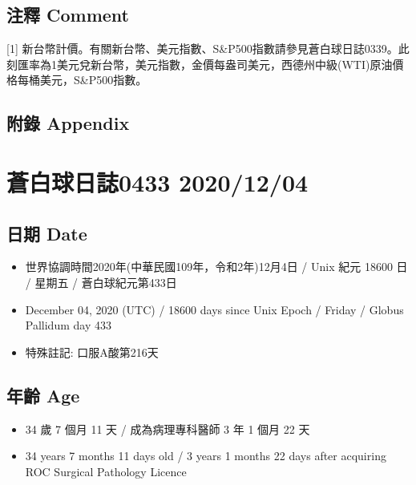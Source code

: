 \documentclass[a5paper, 10pt
]{book}
\providecommand{\tightlist}{%
  \setlength{\itemsep}{0pt}\setlength{\parskip}{0pt}}
\begin{document}
\hypertarget{ux6ce8ux91cb-comment-2}{%
\subsection{注釋 Comment}\label{ux6ce8ux91cb-comment-2}}

{[}1{]}
新台幣計價。有關新台幣、美元指數、S\&P500指數請參見蒼白球日誌0339。此刻匯率為1美元兌新台幣，美元指數，金價每盎司美元，西德州中級(WTI)原油價格每桶美元，S\&P500指數。

\hypertarget{ux9644ux9304-appendix-2}{%
\subsection{附錄 Appendix}\label{ux9644ux9304-appendix-2}}

\hypertarget{ux84bcux767dux7403ux65e5ux8a8c0433-20201204}{%
\section{蒼白球日誌0433
2020/12/04}\label{ux84bcux767dux7403ux65e5ux8a8c0433-20201204}}

\hypertarget{ux65e5ux671f-date-3}{%
\subsection{日期 Date}\label{ux65e5ux671f-date-3}}

\begin{itemize}
\tightlist
\item
  世界協調時間2020年(中華民國109年，令和2年)12月4日 / Unix 紀元 18600 日
  / 星期五 / 蒼白球紀元第433日
\item
  December 04, 2020 (UTC) / 18600 days since Unix Epoch / Friday /
  Globus Pallidum day 433
\item
  特殊註記: 口服A酸第216天
\end{itemize}

\hypertarget{ux5e74ux9f61-age-3}{%
\subsection{年齡 Age}\label{ux5e74ux9f61-age-3}}

\begin{itemize}
\tightlist
\item
  34 歲 7 個月 11 天 / 成為病理專科醫師 3 年 1 個月 22 天
\item
  34 years 7 months 11 days old / 3 years 1 months 22 days after
  acquiring ROC Surgical Pathology Licence
\end{itemize}
\end{document}
